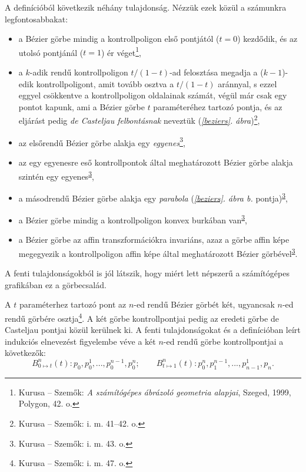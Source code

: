 \documentclass[12pt]{report}
\theoremstyle{definition}
\begin{document}
A definícióból következik néhány tulajdonság. Nézzük ezek közül a
számunkra legfontosabbakat:
\begin{itemize}[noitemsep,topsep=0pt]
  \item a Bézier görbe mindig a kontrollpoligon első pontjától ($t=0$)
  kezdődik, és az utolsó pontjánál ($t=1$) ér véget\footnote{Kurusa --
  Szemők: \emph{A számítógépes ábrázoló geometria alapjai}, Szeged,
  1999, Polygon, 42. o.},
  \item a $k$-adik rendű kontrollpoligon $t/(1-t)$-ad felosztása megadja a
  ($k-1$)-edik kontrollpoligont, amit tovább osztva a $t/(1-t)$ aránnyal, s
  ezzel eggyel csökkentve a kontrollpoligon oldalainak számát, végül már csak
  egy pontot kapunk, ami a Bézier görbe $t$ paraméteréhez tartozó pontja, és az
  eljárást pedig \emph{de Casteljau felbontásnak} neveztük
  (\emph{\ref{beziers}. ábra})\footnote{Kurusa --
  Szemők: i. m. 41--42. o.},
  \item az elsőrendű Bézier görbe alakja egy \emph{egyenes}\footnote{Kurusa --
  Szemők: i. m. 43. o.\label{fn:Kurusa:43p}},
  \item az egy egyenesre eső kontrollpontok által meghatározott Bézier görbe
  alakja szintén egy egyenes\textsuperscript{\ref{fn:Kurusa:43p}},
  \item a másodrendű Bézier görbe alakja egy \emph{parabola}
  (\emph{\ref{beziers}. ábra b.} pontja)\textsuperscript{\ref{fn:Kurusa:43p}},
  \item a Bézier görbe mindig a kontrollpoligon konvex burkában
  van\textsuperscript{\ref{fn:Kurusa:43p}},
  \item a Bézier görbe az affin transzformációkra invariáns, azaz a görbe
  affin képe megegyezik a kontrollpoligon affin képe által meghatározott
  Bézier görbével\textsuperscript{\ref{fn:Kurusa:43p}}.
\end{itemize}

A fenti tulajdonságokból is jól látszik, hogy miért lett népszerű a
számítógépes grafikában ez a görbecsalád.

A $t$ paraméterhez tartozó pont az $n$-ed rendű Bézier görbét két, ugyancsak
$n$-ed rendű görbére osztja\footnote{Kurusa --
  Szemők: i. m. 47. o.}. A két görbe kontrollpontjai pedig az eredeti görbe
de Casteljau pontjai közül kerülnek ki. A fenti tulajdonságokat és a
definícióban leírt indukciós elnevezést figyelembe véve a két $n$-ed rendű görbe
kontrollpontjai a következők:
\begin{equation}\label{eq:1}
B_{0\mapsto t}^n(t): p_0, p_0^1, ..., p_0^{n-1}, p_0^n; \qquad
B_{t\mapsto 1}^n(t): p_0^n, p_1^{n-1}, ..., p_{n-1}^1, p_n.
\end{equation}
\end{document}
